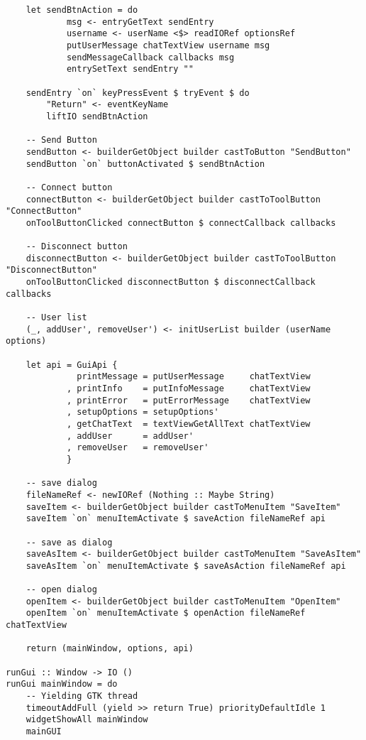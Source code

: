 \documentclass[russian,utf8,simple,emptystyle]{eskdtext}
\begin{document}
\begin{lstlisting}
    let sendBtnAction = do 
            msg <- entryGetText sendEntry
            username <- userName <$> readIORef optionsRef
            putUserMessage chatTextView username msg
            sendMessageCallback callbacks msg 
            entrySetText sendEntry ""

    sendEntry `on` keyPressEvent $ tryEvent $ do 
        "Return" <- eventKeyName
        liftIO sendBtnAction

    -- Send Button
    sendButton <- builderGetObject builder castToButton "SendButton"
    sendButton `on` buttonActivated $ sendBtnAction
        
    -- Connect button
    connectButton <- builderGetObject builder castToToolButton "ConnectButton"
    onToolButtonClicked connectButton $ connectCallback callbacks
        
    -- Disconnect button
    disconnectButton <- builderGetObject builder castToToolButton "DisconnectButton"
    onToolButtonClicked disconnectButton $ disconnectCallback callbacks

    -- User list
    (_, addUser', removeUser') <- initUserList builder (userName options)

    let api = GuiApi {
              printMessage = putUserMessage     chatTextView
            , printInfo    = putInfoMessage     chatTextView
            , printError   = putErrorMessage    chatTextView
            , setupOptions = setupOptions'
            , getChatText  = textViewGetAllText chatTextView
            , addUser      = addUser'
            , removeUser   = removeUser'
            }

    -- save dialog
    fileNameRef <- newIORef (Nothing :: Maybe String)
    saveItem <- builderGetObject builder castToMenuItem "SaveItem"
    saveItem `on` menuItemActivate $ saveAction fileNameRef api 

    -- save as dialog
    saveAsItem <- builderGetObject builder castToMenuItem "SaveAsItem"
    saveAsItem `on` menuItemActivate $ saveAsAction fileNameRef api 

    -- open dialog
    openItem <- builderGetObject builder castToMenuItem "OpenItem"
    openItem `on` menuItemActivate $ openAction fileNameRef chatTextView

    return (mainWindow, options, api)
            
runGui :: Window -> IO ()
runGui mainWindow = do 
    -- Yielding GTK thread
    timeoutAddFull (yield >> return True) priorityDefaultIdle 1
    widgetShowAll mainWindow
    mainGUI
\end{lstlisting}
\end{document}
